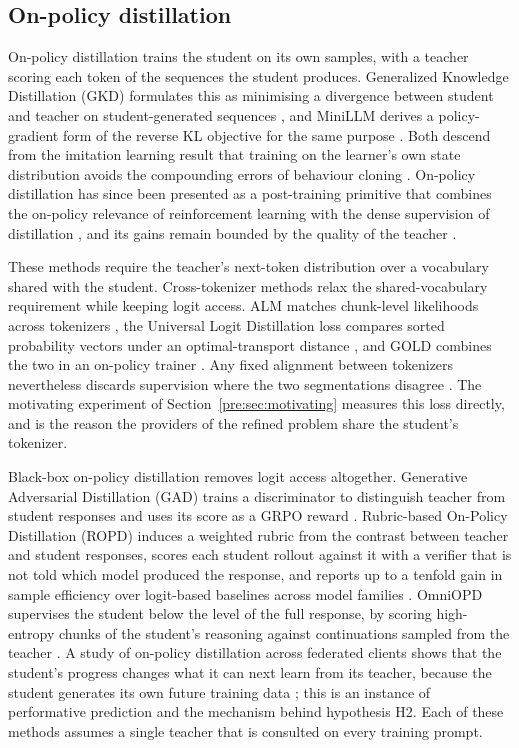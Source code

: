 \subsection{On-policy distillation}
\label{sec:lr-opd}

On-policy distillation trains the student on its own samples, with a teacher scoring
each token of the sequences the student produces. Generalized Knowledge Distillation
(GKD) formulates this as minimising a divergence between student and teacher on
student-generated sequences \autocite{agarwal_gkd_2024}, and MiniLLM derives a
policy-gradient form of the reverse KL objective for the same purpose
\autocite{gu_minillm_2024}. Both descend from the imitation learning result that
training on the learner's own state distribution avoids the compounding errors of
behaviour cloning \autocite{ross_dagger_2011}. On-policy distillation has since been
presented as a post-training primitive that combines the on-policy relevance of
reinforcement learning with the dense supervision of distillation
\autocite{lu_thinkingmachines_opd_2025}, and its gains remain bounded by the quality
of the teacher \autocite{brown_opd_ceiling_2025}.

These methods require the teacher's next-token distribution over a vocabulary shared
with the student. Cross-tokenizer methods relax the shared-vocabulary requirement
while keeping logit access. ALM matches chunk-level likelihoods across tokenizers
\autocite{minixhofer_alm_2025}, the Universal Logit Distillation loss compares sorted
probability vectors under an optimal-transport distance \autocite{boizard_uld_2025},
and GOLD combines the two in an on-policy trainer \autocite{patino_gold_2025}. Any
fixed alignment between tokenizers nevertheless discards supervision where the two
segmentations disagree \autocite{sun_simct_2026,phan_tokenization_bias_2025}. The
motivating experiment of Section~\ref{pre:sec:motivating} measures this loss directly,
and is the reason the providers of the refined problem share the student's tokenizer.

Black-box on-policy distillation removes logit access altogether. Generative
Adversarial Distillation (GAD) trains a discriminator to distinguish teacher from
student responses and uses its score as a GRPO reward \autocite{ye_gad_2025}.
Rubric-based On-Policy Distillation (ROPD) induces a weighted rubric from the contrast
between teacher and student responses, scores each student rollout against it with a
verifier that is not told which model produced the response, and reports up to a
tenfold gain in sample efficiency over logit-based baselines across model families
\autocite{fang_ropd_2026}. OmniOPD supervises the student below the level of the full
response, by scoring high-entropy chunks of the student's reasoning against
continuations sampled from the teacher \autocite{zhou_omniopd_2026}. A study of on-policy distillation across federated clients shows that the student's
progress changes what it can next learn from its teacher, because the student generates
its own future training data \autocite{chen_fedtops_2026}; this is an instance of
performative prediction \autocite{perdomo_performative_2020} and the mechanism behind
hypothesis H2. Each of these methods assumes a single teacher that is consulted on every
training prompt.

